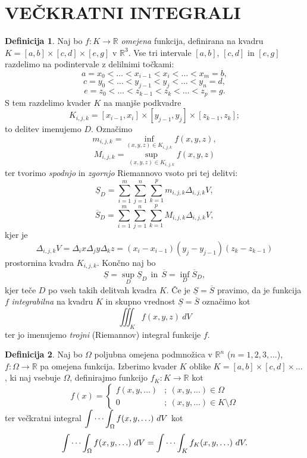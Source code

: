 \documentclass[11pt]{article}
\theoremstyle{definition}
\newtheorem{definicija}{Definicija}[section]
\theoremstyle{definition}
\theoremstyle{definition}
\begin{document}
\section{VEČKRATNI INTEGRALI}
\vspace{0.5cm}

\begin{definicija}

Naj bo $f: K \rightarrow \mathbb{R}$ \textit{omejena} funkcija, definirana na kvadru $K = [a, b] \times [c, d] \times [e, g]$ v $\mathbb{R}^3$. Vse tri intervale $[a, b]$, $[c, d]$ in $[e, g]$ razdelimo na podintervale z delilnimi točkami:
$$a = x_0 < \ldots < x_{i-1} < x_i < \ldots < x_m = b,$$
$$c = y_0 < \ldots < y_{j-1} < y_j < \ldots < y_n = d,$$
$$e = z_0 < \ldots < z_{k-1} < z_k < \ldots < z_p = g.$$ 
S tem razdelimo kvader $K$ na manjše podkvadre 
$$K_{i,j,k} = [x_{i-1}, x_i] \times [y_{j-1}, y_j] \times [z_{k-1}, z_k];$$
to delitev imenujemo $D$. Označimo
$$m_{i,j,k} = \inf_{(x,y,z) \in K_{i,j,k}} f(x, y, z),$$
$$M_{i,j,k} = \sup_{(x,y,z) \in K_{i,j,k}} f(x, y, z)$$
ter tvorimo \textit{spodnjo} in \textit{zgornjo} Riemannovo vsoto pri tej delitvi:
$$\underline{S}_D = \sum_{i=1}^m \sum_{j=1}^n \sum_{k=1}^p m_{i,j,k} \Delta_{i,j,k} V,$$
$$\overline{S}_D = \sum_{i=1}^m \sum_{j=1}^n \sum_{k=1}^p M_{i,j,k} \Delta_{i,j,k} V,$$
kjer je 
$$\Delta_{i,j,k} V = \Delta_i x \Delta_j y \Delta_k z = (x_i - x_{i-1})(y_j - y_{j-1})(z_k - z_{k-1})$$
prostornina kvadra $K_{i,j,k}$. Končno naj bo
$$\underline{S} = \sup_D \underline{S}_D ~~\text{in}~~ \overline{S} = \inf_D \overline{S}_D,$$
kjer teče $D$ po vseh takih delitvah kvadra $K$. Če je $\underline{S} = \overline{S}$ pravimo, da je funkcija $f$ \textit{integrabilna} na kvadru $K$ in skupno vrednost $\underline{S} = \overline{S}$ označimo kot
$$\iiint_K f(x, y, z) ~dV$$
ter jo imenujemo \textit{trojni} (Riemannov) integral funkcije $f$. \\

\end{definicija}
\vspace{0.5cm}

\begin{definicija}

Naj bo $\Omega$ poljubna omejena podmnožica v $\mathbb{R}^n$ ($n = 1, 2, 3, \ldots$), $f: \Omega \rightarrow \mathbb{R}$ pa omejena funkcija. Izberimo kvader $K$ oblike $K = [a, b] \times [c, d] \times \ldots$, ki naj vsebuje $\Omega$, definirajmo funkcijo $f_K: K \rightarrow \mathbb{R}$ kot
$$f(x) = 
\begin{cases}
	f(x, y, \ldots) &; ~(x, y, \ldots) \in \Omega \\
	0 &; ~(x, y, \ldots) \in K \setminus \Omega
\end{cases}$$ 
ter večkratni integral $\mathlarger{\idotsint_\Omega f(x, y, \ldots) ~dV}$ kot
$$\idotsint_\Omega f(x, y, \ldots) ~dV = \idotsint_K f_K(x, y, \ldots) ~dV.$$

\end{definicija}
\vspace{0.5cm}
\end{document}
